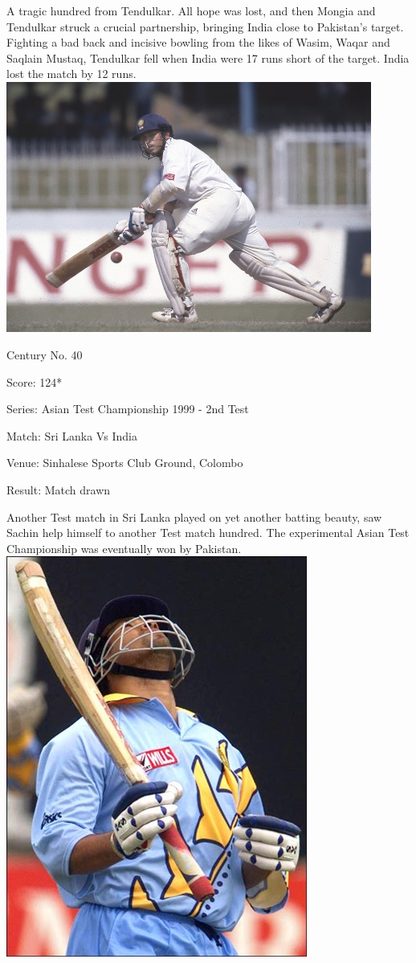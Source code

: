 \documentclass[11pt, a4paper]{article}
\begin{document}
A tragic hundred from Tendulkar. All hope was lost, and then Mongia and Tendulkar struck a crucial partnership, bringing India close to Pakistan's target. Fighting a bad back and incisive bowling from the likes of Wasim, Waqar and Saqlain Mustaq, Tendulkar fell when India were 17 runs short of the target. India lost the match by 12 runs.
\newpage
\includegraphics[width=0.9\textwidth]{pics/40.jpg}

Century No. 40

Score: 124*

Series: Asian Test Championship 1999 - 2nd Test

Match: Sri Lanka Vs India

Venue: Sinhalese Sports Club Ground, Colombo

Result: Match drawn

Another Test match in Sri Lanka played on yet another batting beauty, saw Sachin help himself to another Test match hundred. The experimental Asian Test Championship was eventually won by Pakistan.
\newpage
\includegraphics[height=0.8\textheight]{pics/41.jpg}
\end{document}
